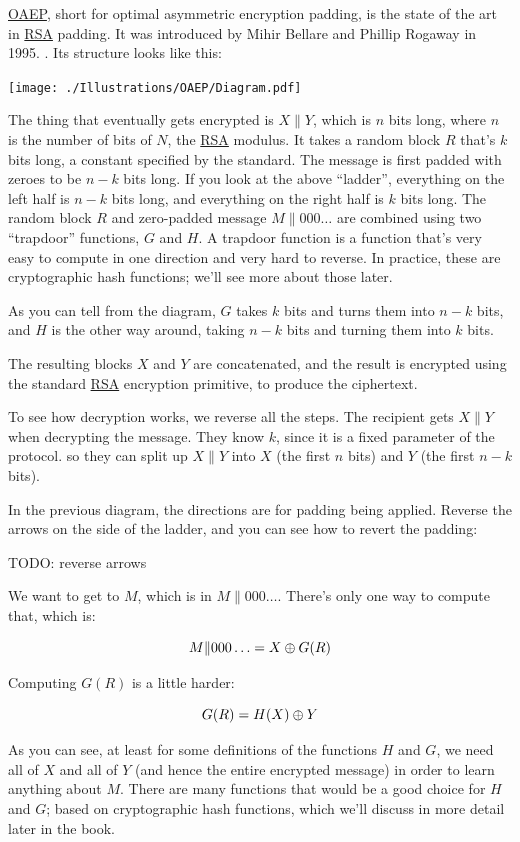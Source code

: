 \documentclass[11pt,ebook,table,dvipsnames]{memoir}
\begin{document}
\hyperref[OAEP]{OAEP}, short for optimal asymmetric encryption padding, is the state of
the art in \hyperref[RSA]{RSA} padding. It was introduced by Mihir Bellare and Phillip
Rogaway in 1995. \cite{bellarerogaway:oaep}. Its structure looks like
this:

\texttt{[image: ./Illustrations/OAEP/Diagram.pdf]}

The thing that eventually gets encrypted is $X \| Y$, which is $n$
bits long, where $n$ is the number of bits of $N$, the \hyperref[RSA]{RSA} modulus. It
takes a random block $R$ that's $k$ bits long, a constant specified by
the standard. The message is first padded with zeroes to be $n - k$
bits long. If you look at the above \enquote{ladder}, everything on the left
half is $n - k$ bits long, and everything on the right half is $k$
bits long. The random block $R$ and zero-padded message $M \|
000\ldots$ are combined using two \enquote{trapdoor} functions, $G$ and $H$. A
trapdoor function is a function that's very easy to compute in one
direction and very hard to reverse. In practice, these are
cryptographic hash functions; we'll see more about those later.

As you can tell from the diagram, $G$ takes $k$ bits and turns them
into $n - k$ bits, and $H$ is the other way around, taking $n - k$
bits and turning them into $k$ bits.

The resulting blocks $X$ and $Y$ are concatenated, and the result is
encrypted using the standard \hyperref[RSA]{RSA} encryption primitive, to produce the
ciphertext.

To see how decryption works, we reverse all the steps. The recipient
gets $X \| Y$ when decrypting the message. They know $k$, since it is a
fixed parameter of the protocol. so they can split up $X \| Y$ into
$X$ (the first $n$ bits) and $Y$ (the first $n - k$ bits).

In the previous diagram, the directions are for padding being applied.
Reverse the arrows on the side of the ladder, and you can see how to
revert the padding:

TODO: reverse arrows

We want to get to $M$, which is in $M \| 000\ldots$. There's only one
way to compute that, which is:

\[
M \| 000\ldots = X \oplus G(R)
\]

Computing $G(R)$ is a little harder:

\[
G(R) = H(X) \oplus Y
\]

As you can see, at least for some definitions of the functions $H$ and
$G$, we need all of $X$ and all of $Y$ (and hence the entire encrypted
message) in order to learn anything about $M$. There are many
functions that would be a good choice for $H$ and $G$; based on
cryptographic hash functions, which we'll discuss in more detail later
in the book.
\end{document}
